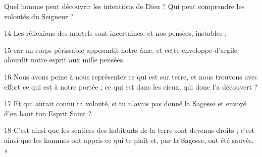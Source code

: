 Quel homme peut découvrir les intentions de Dieu ? Qui peut comprendre les volontés du Seigneur ?

14 Les réflexions des mortels sont incertaines, et nos pensées, instables ;

15 car un corps périssable appesantit notre âme, et cette enveloppe d’argile alourdit notre esprit aux mille pensées.

16 Nous avons peine à nous représenter ce qui est sur terre, et nous trouvons avec effort ce qui est à notre portée ; ce qui est dans les cieux, qui donc l’a découvert ?

17 Et qui aurait connu ta volonté, si tu n’avais pas donné la Sagesse et envoyé d’en haut ton Esprit Saint ?

18 C’est ainsi que les sentiers des habitants de la terre sont devenus droits ; c’est ainsi que les hommes ont appris ce qui te plaît et, par la Sagesse, ont été sauvés. »